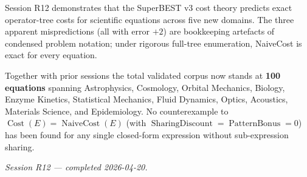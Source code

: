 \documentclass[12pt,a4paper]{article}
\theoremstyle{definition}
\newcommand{\Cost}{\operatorname{Cost}}
\newcommand{\NC}{\operatorname{NaiveCost}}
\newcommand{\SD}{\operatorname{SharingDiscount}}
\newcommand{\PB}{\operatorname{PatternBonus}}
\begin{document}
Session R12 demonstrates that the SuperBEST v3 cost theory predicts exact
operator-tree costs for scientific equations across five new domains.
The three apparent mispredictions (all with error $+2$) are bookkeeping
artefacts of condensed problem notation; under rigorous full-tree enumeration,
NaiveCost is exact for every equation.

Together with prior sessions the total validated corpus now stands at
\textbf{100 equations} spanning Astrophysics, Cosmology, Orbital Mechanics,
Biology, Enzyme Kinetics, Statistical Mechanics, Fluid Dynamics, Optics,
Acoustics, Materials Science, and Epidemiology.
No counterexample to $\Cost(E) = \NC(E)$ (with $\SD=\PB=0$) has been found
for any single closed-form expression without sub-expression sharing.

\bigskip
\noindent\textit{Session R12 — completed 2026-04-20.}
\end{document}
